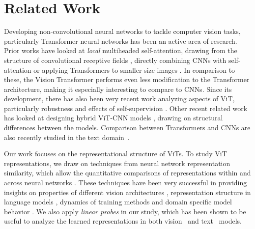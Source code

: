 \documentclass{article}
\begin{document}
\section{Related Work}
\vspace{-0.25em}
Developing non-convolutional neural networks to tackle computer vision tasks, particularly Transformer neural networks \cite{vaswani2017attention} has been an active area of research. Prior works have looked at \textit{local} multiheaded self-attention, drawing from the structure of convolutional receptive fields \cite{parmar2018image, ramachandran2019stand}, directly combining CNNs with self-attention \cite{carion2020end, bello2019attention, wu2020visual} or applying Transformers to smaller-size images \cite{chen2020generative, cordonnier2019relationship}. In comparison to these, the Vision Transformer \cite{dosovitskiy2020image} performs even less modification to the Transformer architecture, making it especially interesting to compare to CNNs. Since its development, there has also been very recent work analyzing aspects of ViT, particularly robustness \cite{bhojanapalli2021understanding, paul2021vision,naseer2021intriguing} and effects of self-supervision \cite{caron2021emerging,chen2021empirical}. Other recent related work has looked at designing hybrid ViT-CNN models \cite{yuan2021tokens, d2021convit}, drawing on structural differences between the models. Comparison between Transformers and CNNs are also recently studied in the text domain~\citep{tay2021pre}.

Our work focuses on the representational structure of ViTs. To study ViT representations, we draw on techniques from neural network representation similarity, which allow the quantitative comparisons of representations within and across neural networks \cite{kornblith2019similarity, raghu2017svcca, morcos2018insights, kriegeskorte2008representational}. These techniques have been very successful in providing insights on properties of different vision architectures \cite{nguyen2020wide, lindsay2020convolutional, kornblith2020s}, representation structure in language models \cite{wu2019emerging, merchant2020happens, wu2020similarity, kudugunta2019investigating}, dynamics of training methods \cite{raghu2019rapid, maheswaranathan2019universality} and domain specific model behavior \cite{mustafa2021supervised, raghu2019transfusion, shi2019comparison}. We also apply \emph{linear probes} in our study, which has been shown to be useful to analyze the learned representations in both vision~\citep{alain2016understanding} and text~\citep{conneau2018you,peters2018dissecting,voita2019bottom} models.
\end{document}
